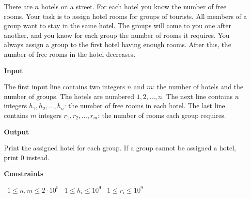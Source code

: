 There are $n$ hotels on a street. For each hotel you know the number of free rooms. Your task is to assign hotel rooms for groups of tourists. All members of a group want to stay in the same hotel.
The groups will come to you one after another, and you know for each group the number of rooms it requires. You always assign a group to the first hotel having enough rooms. After this, the number of free rooms in the hotel decreases.

\vspace{0.3cm}\noindent\textbf{Input}

The first input line contains two integers $n$ and $m$: the number of hotels and the number of groups. The hotels are numbered $1,2,\ldots,n$.
The next line contains $n$ integers $h_1,h_2,\ldots,h_n$: the number of free rooms in each hotel.
The last line contains $m$ integers $r_1,r_2,\ldots,r_m$: the number of rooms each group requires.

\vspace{0.3cm}\noindent\textbf{Output}

Print the assigned hotel for each group. If a group cannot be assigned a hotel, print 0 instead.

\vspace{0.3cm}\noindent\textbf{Constraints}

\textbullet\ $1 \le n,m \le 2 \cdot 10^5$
\textbullet\ $1 \le h_i \le 10^9$
\textbullet\ $1 \le r_i \le 10^9$